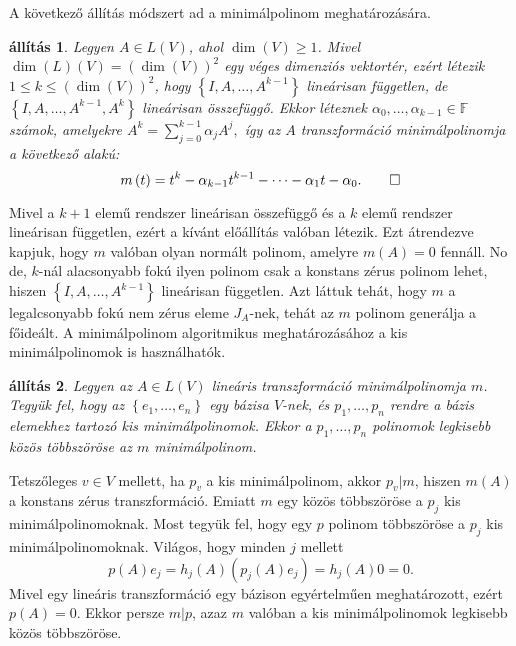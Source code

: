 \documentclass[9pt, a4paper, showtrims]{memoir}
\makeatletter
\renewenvironment{proof}[1][\proofname]
    {\par\pushQED{\qed}%
    \normalfont \topsep6\p@\@plus6\p@\relax
    \trivlist
    \item[\hskip\labelsep
        \itshape
    #1\@addpunct{:}]\ignorespaces}
    {\popQED\endtrivlist\@endpefalse}
\theoremstyle{plain}
\newtheorem{proposition}{állítás}[chapter]
\theoremstyle{remark}
\theoremstyle{definition}
\makeatother
\begin{document}
A következő állítás módszert ad a minimálpolinom meghatározására.
\begin{proposition}
	Legyen $A\in L\left( V \right)$, ahol $\dim(V)\geq 1$.
	Mivel $\dim(L)\left( V \right)=\left( \dim(V) \right)^2$ egy véges dimenziós vektortér,
	ezért létezik $1\leq k \leq (\dim(V))^2$,
	hogy
	$\left\{ I,A,\ldots,A^{k-1} \right\}$ lineárisan független,
	de $\left\{ I,A,\ldots,A^{k-1},A^{k} \right\}$ lineárisan összefüggő.
	Ekkor léteznek $\alpha_0,\ldots,\alpha_{k-1}\in\mathbb{F}$
	számok, amelyekre
	\(
		A^{k}=\sum_{j=0}^{k-1}\alpha_jA^{j},
	\)
	így az $A$ transzformáció minimálpolinomja a következő alakú:
	\[
		m\left( t \right)=
		t^k-\alpha_{k-1}t^{k-1}-\dots-\alpha_1t-\alpha_0.\qedhere
	\]
\end{proposition}
\begin{proof}
	Mivel a $k+1$ elemű rendszer lineárisan összefüggő és a $k$ elemű rendszer lineárisan független,
	ezért a kívánt előállítás valóban létezik.
	Ezt átrendezve kapjuk, hogy $m$ valóban olyan normált polinom, amelyre $m\left( A \right)=0$ fennáll.
	No de, $k$-nál alacsonyabb fokú ilyen polinom csak a konstans zérus polinom lehet,
	hiszen $\left\{ I,A,\ldots,A^{k-1} \right\}$ lineárisan független.
	Azt láttuk tehát, hogy $m$ a legalcsonyabb fokú nem zérus eleme $J_{A}$-nek,
	tehát az $m$ polinom generálja a főideált.
\end{proof}
A minimálpolinom algoritmikus meghatározásához a kis minimálpolinomok is használhatók.
\begin{proposition}
    \label{pr:lkkt-minimalpolinom}
	Legyen az $A\in L\left( V \right)$ lineáris transzformáció minimálpolinomja $m$.
	Tegyük fel, hogy az $\left\{ e_1,\ldots,e_n \right\}$ egy bázisa $V$-nek,
	és $p_1,\ldots,p_n$ rendre a bázis elemekhez tartozó kis minimálpolinomok.
	Ekkor a $p_1,\ldots,p_n$ polinomok legkisebb közös többszöröse az $m$ minimálpolinom.
\end{proposition}
\begin{proof}
	Tetszőleges $v\in V$ mellett, ha $p_v$ a kis minimálpolinom,
	akkor $p_v|m$, hiszen $m\left( A \right)$ a konstans zérus transzformáció.
	Emiatt $m$ egy közös többszöröse a $p_j$ kis minimálpolinomoknak.
	Most tegyük fel, hogy egy $p$ polinom többszöröse a $p_j$ kis minimálpolinomoknak.
	Világos, hogy minden $j$ mellett
	\[
		p\left( A \right)e_j
		=
		h_j\left( A \right)\left( p_j\left( A \right)e_j \right)
		=
		h_j\left( A \right)0
		=
		0.
	\]
	Mivel egy lineáris transzformáció egy bázison egyértelműen meghatározott, ezért
	$p\left( A \right)=0$.
	Ekkor persze $m|p$,
	azaz $m$ valóban  a kis minimálpolinomok legkisebb közös többszöröse.
\end{proof}
\end{document}
